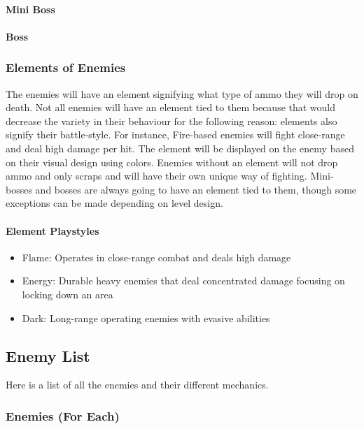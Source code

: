 \documentclass[12pt]{article}
\begin{document}
\paragraph{Mini Boss}

\paragraph{Boss}

\subsubsection{Elements of Enemies}

The enemies will have an element signifying what type of ammo they will drop on death. Not all enemies will have an element tied to them because that would decrease the variety in their behaviour for the following reason: elements also signify their battle-style. For instance, Fire-based enemies will fight close-range and deal high damage per hit. The element will be displayed on the enemy based on their visual design using colors. Enemies without an element will not drop ammo and only scraps and will have their own unique way of fighting. Mini-bosses and bosses are always going to have an element tied to them, though some exceptions can be made depending on level design. 

\paragraph{Element Playstyles}

\begin{itemize}
	\item Flame: Operates in close-range combat and deals high damage
	\item Energy: Durable heavy enemies that deal concentrated damage focusing on locking down an area
	\item Dark: Long-range operating enemies with evasive abilities
\end{itemize}


\subsection{Enemy List}

Here is a list of all the enemies and their different mechanics. 

\subsubsection{Enemies (For Each)}
\end{document}
